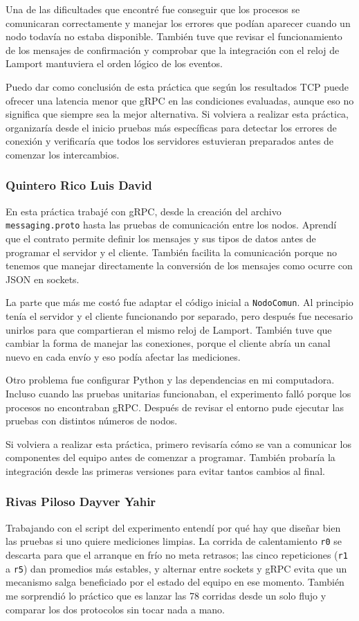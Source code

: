 Una de las dificultades que encontré fue conseguir que los
procesos se comunicaran correctamente y manejar los errores
que podían aparecer cuando un nodo todavía no estaba disponible.
También tuve que revisar el funcionamiento de los mensajes de
confirmación y comprobar que la integración con el reloj de Lamport
mantuviera el orden lógico de los eventos.

Puedo dar como conclusión de esta práctica que según los resultados
TCP puede ofrecer una latencia menor que gRPC en las condiciones
evaluadas, aunque eso no significa que siempre sea la mejor alternativa.
Si volviera a realizar esta práctica, organizaría desde el inicio pruebas
más específicas para detectar los errores de conexión y verificaría
que todos los servidores estuvieran preparados antes de comenzar los intercambios.

\subsubsection*{Quintero Rico Luis David}

En esta práctica trabajé con gRPC, desde la creación del archivo \texttt{messaging.proto} hasta las pruebas de comunicación entre los nodos. Aprendí que el contrato permite definir los mensajes y sus tipos de datos antes de programar el servidor y el cliente. También facilita la comunicación porque no tenemos que manejar directamente la conversión de los mensajes como ocurre con JSON en sockets.

La parte que más me costó fue adaptar el código inicial a \texttt{NodoComun}. Al principio tenía el servidor y el cliente funcionando por separado, pero después fue necesario unirlos para que compartieran el mismo reloj de Lamport. También tuve que cambiar la forma de manejar las conexiones, porque el cliente abría un canal nuevo en cada envío y eso podía afectar las mediciones.

Otro problema fue configurar Python y las dependencias en mi computadora. Incluso cuando las pruebas unitarias funcionaban, el experimento falló porque los procesos no encontraban gRPC. Después de revisar el entorno pude ejecutar las pruebas con distintos números de nodos.

Si volviera a realizar esta práctica, primero revisaría cómo se van a comunicar los componentes del equipo antes de comenzar a programar. También probaría la integración desde las primeras versiones para evitar tantos cambios al final.

\subsubsection*{Rivas Piloso Dayver Yahir}
Trabajando con el script del experimento entendí por qué hay que diseñar bien las pruebas si uno quiere mediciones limpias. La corrida de calentamiento \texttt{r0} se descarta para que el arranque en frío no meta retrasos; las cinco repeticiones (\texttt{r1} a \texttt{r5}) dan promedios más estables, y alternar entre sockets y gRPC evita que un mecanismo salga beneficiado por el estado del equipo en ese momento. También me sorprendió lo práctico que es lanzar las 78 corridas desde un solo flujo y comparar los dos protocolos sin tocar nada a mano.


